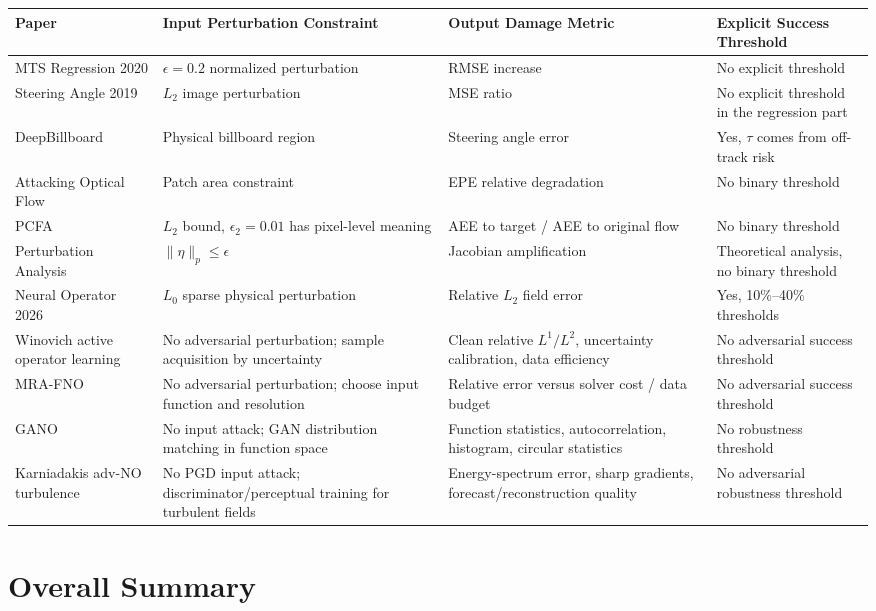 \documentclass{article}
\begin{document}
\begin{center}\footnotesize\begin{tabular}{>{\raggedright\arraybackslash}p{2.8cm}>{\raggedright\arraybackslash}p{3.0cm}>{\raggedright\arraybackslash}p{3.0cm}>{\raggedright\arraybackslash}p{3.0cm}}
\hline
Paper & Input Perturbation Constraint & Output Damage Metric & Explicit Success Threshold \\
\hline
MTS Regression 2020 & \(\epsilon=0.2\) normalized perturbation & RMSE increase & No explicit threshold \\
Steering Angle 2019 & \(L_2\) image perturbation & MSE ratio & No explicit threshold in the regression part \\
DeepBillboard & Physical billboard region & Steering angle error & Yes, \(\tau\) comes from off-track risk \\
Attacking Optical Flow & Patch area constraint & EPE relative degradation & No binary threshold \\
PCFA & \(L_2\) bound, \(\epsilon_2=0.01\) has pixel-level meaning & AEE to target / AEE to original flow & No binary threshold \\
Perturbation Analysis & \(\|\eta\|_p\leq \epsilon\) & Jacobian amplification & Theoretical analysis, no binary threshold \\
Neural Operator 2026 & \(L_0\) sparse physical perturbation & Relative \(L_2\) field error & Yes, 10\%--40\% thresholds \\
Winovich active operator learning & No adversarial perturbation; sample acquisition by uncertainty & Clean relative \(L^1/L^2\), uncertainty calibration, data efficiency & No adversarial success threshold \\
MRA-FNO & No adversarial perturbation; choose input function and resolution & Relative error versus solver cost / data budget & No adversarial success threshold \\
GANO & No input attack; GAN distribution matching in function space & Function statistics, autocorrelation, histogram, circular statistics & No robustness threshold \\
Karniadakis adv-NO turbulence & No PGD input attack; discriminator/perceptual training for turbulent fields & Energy-spectrum error, sharp gradients, forecast/reconstruction quality & No adversarial robustness threshold \\
\hline
\end{tabular}
\end{center}

\section{Overall Summary}
\end{document}
